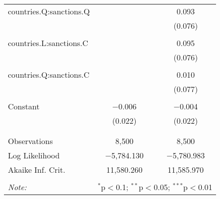 \begin{table}[!htbp]
\begin{tabular}{@{\extracolsep{5pt}}lcc}
 countries.Q:sanctions.Q &  & 0.093 \\ 
  &  & (0.076) \\ 
  & & \\ 
 countries.L:sanctions.C &  & 0.095 \\ 
  &  & (0.076) \\ 
  & & \\ 
 countries.Q:sanctions.C &  & 0.010 \\ 
  &  & (0.077) \\ 
  & & \\ 
 Constant & $-$0.006 & $-$0.004 \\ 
  & (0.022) & (0.022) \\ 
  & & \\ 
\hline \\[-1.8ex] 
Observations & 8,500 & 8,500 \\ 
Log Likelihood & $-$5,784.130 & $-$5,780.983 \\ 
Akaike Inf. Crit. & 11,580.260 & 11,585.970 \\ 
\hline 
\hline \\[-1.8ex] 
\textit{Note:}  & \multicolumn{2}{r}{$^{*}$p$<$0.1; $^{**}$p$<$0.05; $^{***}$p$<$0.01} \\ 
\end{tabular} 
\end{table}  
